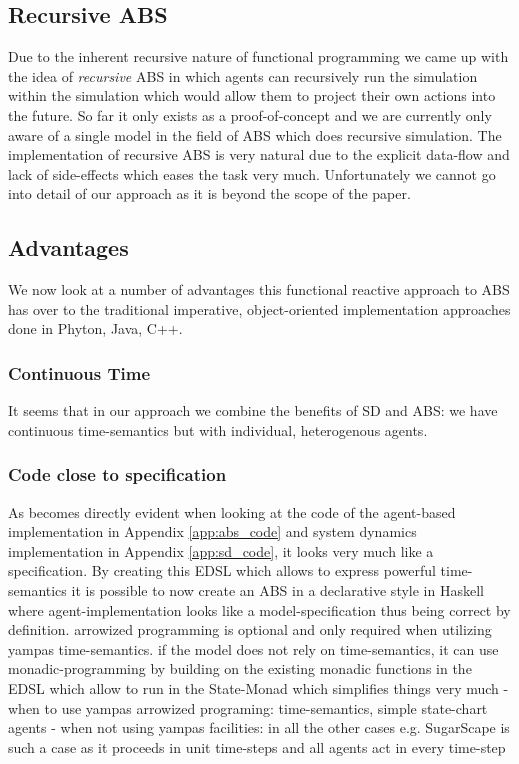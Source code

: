 \subsection{Recursive ABS}
Due to the inherent recursive nature of functional programming we came up with the idea of \textit{recursive} ABS in which agents can recursively run the simulation within the simulation which would allow them to project their own actions into the future. So far it only exists as a proof-of-concept and we are currently only aware of a single model \cite{gilmer_recursive_2000} in the field of ABS which does recursive simulation. The implementation of recursive ABS is very natural due to the explicit data-flow and lack of side-effects which eases the task very much. Unfortunately we cannot go into detail of our approach as it is beyond the scope of the paper.

\subsection{Advantages}
We now look at a number of advantages this functional reactive approach to ABS has over to the traditional imperative, object-oriented implementation approaches done in Phyton, Java, C++.

\subsubsection{Continuous Time}
It seems that in our approach we combine the benefits of SD and ABS: we have continuous time-semantics but with individual, heterogenous agents.

\subsubsection{Code close to specification}
As becomes directly evident when looking at the code of the agent-based implementation in Appendix \ref{app:abs_code} and system dynamics implementation in Appendix \ref{app:sd_code}, it looks very much like a specification. By creating this EDSL which allows to express powerful time-semantics it is possible to now create an ABS in a declarative style in Haskell where agent-implementation looks like a model-specification thus being correct by definition.
arrowized programming is optional and only required when utilizing yampas time-semantics. if the model does not rely on time-semantics, it can use monadic-programming by building on the existing monadic functions in the EDSL which allow to run in the State-Monad which simplifies things very much
	- when to use yampas arrowized programing: time-semantics, simple state-chart agents 
	- when not using yampas facilities: in all the other cases e.g. SugarScape is such a case as it proceeds in unit time-steps and all agents act in every time-step
	
